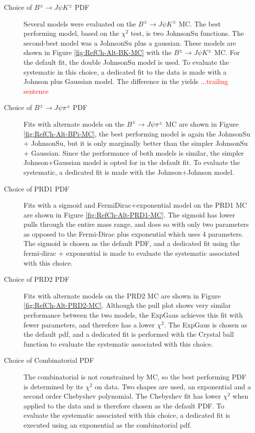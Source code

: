 \begin{description}
    \item[Choice of $B^{\pm}\to J\psi K^\pm$ PDF] Several models were evaluated on the $B^{\pm}\to J\psi K^\pm$ MC. The best performing model, based on the $\chi^2$ test, is two JohnsonSu functions. The second-best model was a JohnsonSu plus a gaussian. These models are shown in Figure \ref{fig:RefCh-Alt-BK-MC} with the $B^{\pm}\to J\psi K^\pm$ MC. For the default fit, the double JohnsonSu model is used. To evaluate the systematic in this choice, a dedicated fit to the data is made with a Johnson plus Gaussian model. The difference in the yields \textcolor{red}{...trailing sentence} 

    \item[Choice of $B^{\pm}\to J\psi \pi^\pm$ PDF] Fits with alternate models on the $B^{\pm}\to J\psi \pi^\pm$ MC are shown in Figure \ref{fig:RefCh-Alt-BPi-MC}, the best performing model is again the JohnsonSu + JohnsonSu, but it is only marginally better than the simpler JohnsonSu + Gaussian. Since the performance of both models is similar, the simpler Johnson+Gaussian model is opted for in the default fit. To evaluate the systematic, a dedicated fit is made with the Johnson+Johnson model.


    \item[Choice of PRD1 PDF] Fits with a sigmoid and FermiDirac+exponential model on the PRD1 MC are shown in Figure \ref{fig:RefCh-Alt-PRD1-MC}. The sigmoid has lower pulls through the entire mass range, and does so with only two parameters as opposed to the Fermi-Dirac plus exponential which uses 4 parameters. The sigmoid is chosen as the default PDF, and a dedicated fit using the fermi-dirac + exponential is made to evaluate the systematic associated with this choice. 
    
    \item[Choice of PRD2 PDF] Fits with alternate models on the PRD2 MC are shown in Figure \ref{fig:RefCh-Alt-PRD2-MC}. Although the pull plot shows very similar performance between the two models, the ExpGaus achieves this fit with fewer parameters, and therefore has a lower $\chi^2$. The ExpGaus is chosen as the default pdf, and a dedicated fit is performed with the Crystal ball function to evaluate the systematic associated with this choice. 

    \item [Choice of Combinatorial PDF] The combinatorial is not constrained by MC, so the best performing PDF is determined by its $\chi^2$ on data. Two shapes are used, an exponential and a second order Chebyshev polynomial. The Chebyshev fit has lower $\chi^2$ when applied to the data and is therefore chosen as the default PDF. To evaluate the systematic associated with this choice, a dedicated fit is executed using an exponential as the combinatorial pdf.

\end{description}


